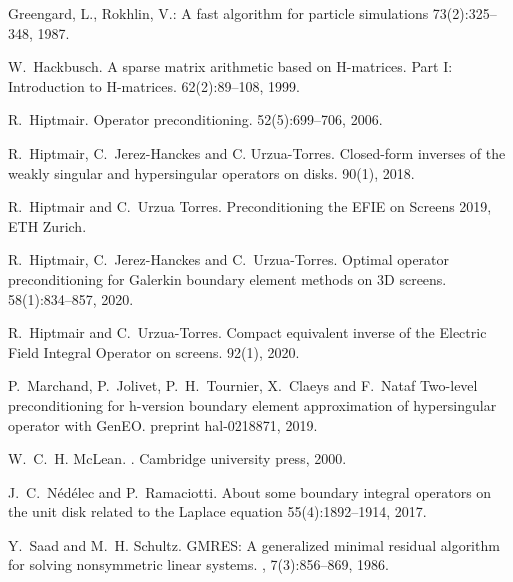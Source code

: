 \documentclass[]{article}
\begin{document}
\begin{small}
\begin{thebibliography}{0}
		Greengard, L., Rokhlin, V.:
		\newblock A fast algorithm for particle simulations
		 73(2):325--348, 1987.
		
		W.~Hackbusch.
		\newblock A sparse matrix arithmetic based on H-matrices. Part I: Introduction to H-matrices.
		 62(2):89--108, 1999.
		
		R.~Hiptmair.
		\newblock Operator preconditioning.
		 52(5):699--706, 2006.
		
		
		R.~Hiptmair, C.~Jerez-Hanckes and C. Urzua-Torres.
		\newblock Closed-form inverses of the weakly singular and hypersingular operators on disks.
		 90(1), 2018.
		
		
		R.~Hiptmair and C.~Urzua Torres.
		Preconditioning the EFIE on Screens
		 2019, ETH Zurich.
		
		
		R.~Hiptmair, C.~Jerez-Hanckes and C.~Urzua-Torres.
		\newblock Optimal operator preconditioning for Galerkin boundary element methods on 3D screens. 
		 58(1):834--857, 2020.
		
		R.~Hiptmair and C.~Urzua-Torres.
		\newblock Compact equivalent inverse of the {E}lectric {F}ield
		{I}ntegral {O}perator on screens.
		 92(1), 2020.

		P.~Marchand, P.~Jolivet, P.~H.~Tournier, X.~Claeys and F.~Nataf
		\newblock Two-level preconditioning for h-version boundary element approximation of hypersingular operator with GenEO.
		 preprint hal-0218871, 2019.

		
		W.~C.~H. McLean.
		.
		\newblock Cambridge university press, 2000.
		
		J.~C.~Nédélec and P.~Ramaciotti.
		\newblock About some boundary integral operators on the unit disk related to the Laplace equation
		 55(4):1892--1914, 2017.
		
		
		Y.~Saad and M.~H. Schultz.
		\newblock GMRES: A generalized minimal residual algorithm for solving
		nonsymmetric linear systems.
		,
		7(3):856--869, 1986.
		

\end{thebibliography}
\end{small}
\end{document}
